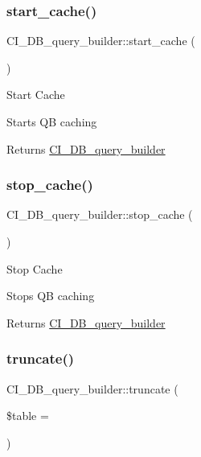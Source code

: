 \subsubsection{\texorpdfstring{start\+\_\+cache()}{start\_cache()}}
{\footnotesize\ttfamily C\+I\+\_\+\+D\+B\+\_\+query\+\_\+builder\+::start\+\_\+cache (\begin{DoxyParamCaption}{ }\end{DoxyParamCaption})}

Start Cache

Starts QB caching

\begin{DoxyReturn}{Returns}
\mbox{\hyperlink{class_c_i___d_b__query__builder}{C\+I\+\_\+\+D\+B\+\_\+query\+\_\+builder}} 
\end{DoxyReturn}
\mbox{\label{class_c_i___d_b__query__builder_a525eb8e766a38561b309b119bd93529f}} 
\subsubsection{\texorpdfstring{stop\+\_\+cache()}{stop\_cache()}}
{\footnotesize\ttfamily C\+I\+\_\+\+D\+B\+\_\+query\+\_\+builder\+::stop\+\_\+cache (\begin{DoxyParamCaption}{ }\end{DoxyParamCaption})}

Stop Cache

Stops QB caching

\begin{DoxyReturn}{Returns}
\mbox{\hyperlink{class_c_i___d_b__query__builder}{C\+I\+\_\+\+D\+B\+\_\+query\+\_\+builder}} 
\end{DoxyReturn}
\mbox{\label{class_c_i___d_b__query__builder_a6fb8a3114ae1460cd9ecf4a328812d31}} 
\subsubsection{\texorpdfstring{truncate()}{truncate()}}
{\footnotesize\ttfamily C\+I\+\_\+\+D\+B\+\_\+query\+\_\+builder\+::truncate (\begin{DoxyParamCaption}\item[{}]{\$table = {\ttfamily \textquotesingle{}\textquotesingle{}} }\end{DoxyParamCaption})}

